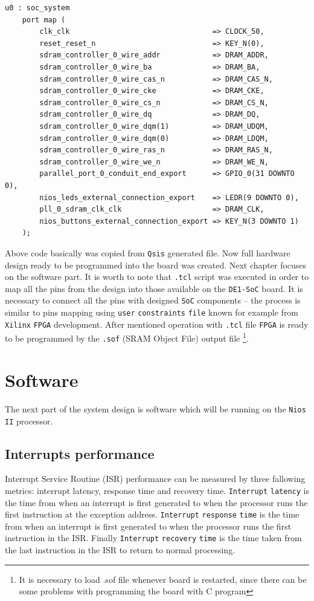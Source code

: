\begin{verbatim}
u0 : soc_system
	port map (
		clk_clk                                 => CLOCK_50,
		reset_reset_n                           => KEY_N(0), 
		sdram_controller_0_wire_addr            => DRAM_ADDR,
		sdram_controller_0_wire_ba              => DRAM_BA,
		sdram_controller_0_wire_cas_n           => DRAM_CAS_N,
		sdram_controller_0_wire_cke             => DRAM_CKE,
		sdram_controller_0_wire_cs_n            => DRAM_CS_N,
		sdram_controller_0_wire_dq              => DRAM_DQ,
		sdram_controller_0_wire_dqm(1)          => DRAM_UDQM,
		sdram_controller_0_wire_dqm(0)          => DRAM_LDQM,
		sdram_controller_0_wire_ras_n           => DRAM_RAS_N,
		sdram_controller_0_wire_we_n            => DRAM_WE_N,
		parallel_port_0_conduit_end_export      => GPIO_0(31 DOWNTO 0),
		nios_leds_external_connection_export    => LEDR(9 DOWNTO 0),
		pll_0_sdram_clk_clk                     => DRAM_CLK,
		nios_buttons_external_connection_export => KEY_N(3 DOWNTO 1)
	);
\end{verbatim}

Above code basically was copied from \verb|Qsis| generated file. Now full hardware design ready to be programmed into the board was created. Next chapter focuses on the software part. It is worth to note that \verb|.tcl| script was executed in order to map all the pins from the design into those available on the \verb|DE1-SoC| board. It is necessary to connect all the pins with designed \verb|SoC| components -- the process is similar to pins mapping using \verb|user| \verb|constraints| \verb|file| known for example from \verb|Xilinx| \verb|FPGA| development. After mentioned operation with \verb|.tcl| file \verb|FPGA| is ready to be programmed by the \verb|.sof| (SRAM Object File) output file \footnote{It is necessary to load .sof file whenever board is restarted, since there can be some problems with programming the board with C program}.

\begingroup
\renewcommand{\cleardoublepage}{}
\renewcommand{\clearpage}{}
\chapter{Software}
\endgroup
The next part of the system design is software which will be running on the \verb|Nios| \verb|II| processor.

\section{Interrupts performance}
Interrupt Service Routine (ISR) performance can be measured by three fallowing metrics: interrupt latency, response time and recovery time. \verb|Interrupt| \verb|latency| is the time from when an interrupt is
first generated to when the processor runs the first
instruction at the exception address. \verb|Interrupt| \verb|response| \verb|time| is the time from when an
interrupt is first generated to when the processor runs
the first instruction in the ISR. Finally \verb|Interrupt| \verb|recovery| \verb|time| is the time taken from the last
instruction in the ISR to return to normal processing. 

